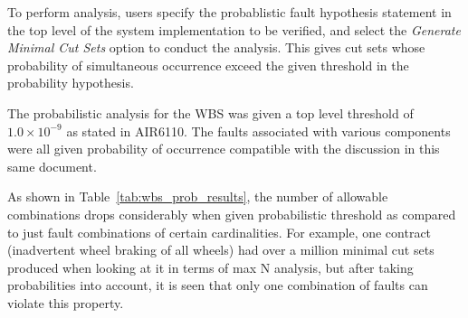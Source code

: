 To perform analysis, users specify the probablistic fault hypothesis statement in the top level of the system implementation to be verified, and select the \textit{Generate Minimal Cut Sets} option to conduct the analysis. This gives cut sets whose probability of simultaneous occurrence exceed the given threshold in the probability hypothesis.

The probabilistic analysis for the WBS was given a top level threshold of $1.0 \times 10^{-9}$ as stated in AIR6110. The faults associated with various components were all given probability of occurrence compatible with the discussion in this same document. 

As shown in Table~\ref{tab:wbs_prob_results}, the number of allowable combinations drops considerably when given probabilistic threshold as compared to just fault combinations of certain cardinalities. For example, one contract (inadvertent wheel braking of all wheels) had over a million minimal cut sets produced when looking at it in terms of max N analysis, but after taking probabilities into account, it is seen that only one combination of faults can violate this property. %


